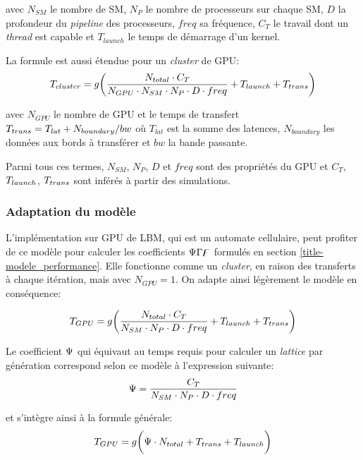 avec $N_{SM}$ le nombre de \ac{SM}, $N_P$ le nombre de processeurs sur chaque \ac{SM}, $D$ la profondeur du \textit{pipeline} des processeurs, $freq$ sa fréquence, $C_T$ le travail dont un \textit{thread} est capable et $T_{launch}$ le temps de démarrage d'un kernel.

La formule est aussi étendue pour un \textit{cluster} de \acs{GPU}:
\begin{equation}
T_{cluster} = g \bigg( \frac{N_{total}\cdot C_T}{N_{GPU} \cdot N_{SM}\cdot N_P \cdot D \cdot freq} + T_{launch}+ T_{trans}\bigg)
\end{equation}

avec $N_{GPU}$ le nombre de \acs{GPU} et le temps de transfert $T_{trans} = T_{lat}+ N_{boundary}/bw$ où $T_{lat}$ est la somme des latences, $N_{boundary}$ les données aux bords à transférer et $bw$ la bande passante. 

Parmi tous ces termes, $N_{SM}$, $N_P$, $D$ et $freq$ sont des propriétés du \acs{GPU} et $C_T$, $T_{launch}$, $T_{trans}$ sont inférés à partir des simulations.
\subsubsection{Adaptation du modèle}
L'implémentation sur \acs{GPU} de \ac{LBM}, qui est un automate cellulaire, peut profiter de ce modèle pour calculer les coefficients $\Psi\Gamma\digamma$ formulés en section \ref{title-modele_performance}.  Elle fonctionne comme un \textit{cluster}, en raison des transferts à chaque itération, mais avec $N_{GPU}=1$. On adapte ainsi légèrement le modèle en conséquence:

\begin{equation}
T_{GPU} = g \bigg( \frac{N_{total}\cdot C_T}{N_{SM}\cdot N_P \cdot D \cdot freq} + T_{launch} + T_{trans}\bigg)
\end{equation}

Le coefficient $\Psi$ qui équivaut au temps requis pour calculer un \textit{lattice} par génération correspond selon ce modèle à l'expression suivante:
\begin{equation}
\Psi= \frac{C_T}{N_{SM}\cdot N_P \cdot D \cdot freq}
\end{equation}

et s'intègre ainsi à la formule générale:
\begin{equation}
T_{GPU} = g \bigg( \Psi \cdot N_{total} + T_{trans} + T_{launch}  \bigg)
\end{equation}

